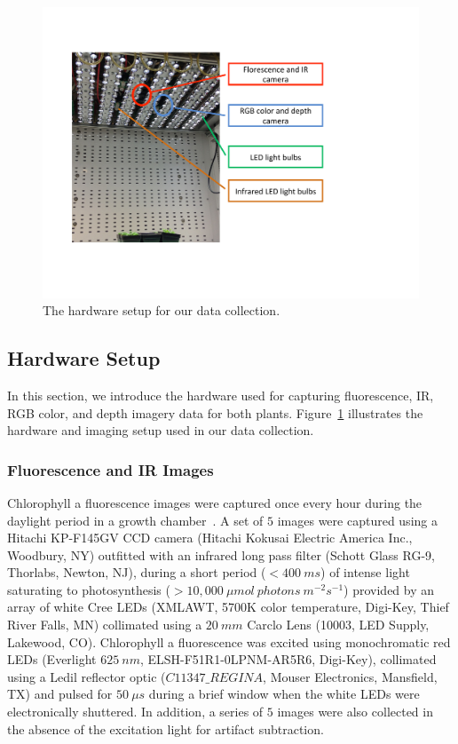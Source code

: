 \begin{figure}
  \includegraphics[width=\linewidth,trim=55 100 200 70,clip]{Figures/hardware}
\caption{The hardware setup for our data collection.}
\label{fig:hardware}
\end{figure}

\subsection{Hardware Setup}

In this section, we introduce the hardware used for capturing fluorescence, IR, RGB color, and depth imagery data for both plants.
Figure~\ref{fig:hardware} illustrates the hardware and imaging setup used in our data collection.

\subsubsection{Fluorescence and IR Images}
Chlorophyll a fluorescence images were captured once every hour during the daylight period in a growth chamber~\cite{cruz2015depi}.
A set of $5$ images were captured using a Hitachi KP-F145GV CCD camera (Hitachi Kokusai Electric America Inc., Woodbury, NY) outfitted with an infrared long pass filter (Schott Glass RG-9, Thorlabs, Newton, NJ), during a short period ($<400~ms$) of intense light saturating to photosynthesis ($>10,000~\mu mol~photons~m^{-2} s^{-1}$) provided by an array of white Cree LEDs (XMLAWT, 5700K color temperature, Digi-Key, Thief River Falls, MN) collimated using a $20~mm$ Carclo Lens (10003, LED Supply, Lakewood, CO).
%
Chlorophyll a fluorescence was excited using monochromatic red LEDs (Everlight $625~nm$, ELSH-F51R1-0LPNM-AR5R6, Digi-Key), collimated using a Ledil reflector optic ($C11347\_REGINA$, Mouser Electronics, Mansfield, TX) and pulsed for $50~\mu s$ during a brief window when the white LEDs were electronically shuttered.
In addition, a series of $5$ images were also collected in the absence of the excitation light for artifact subtraction.

